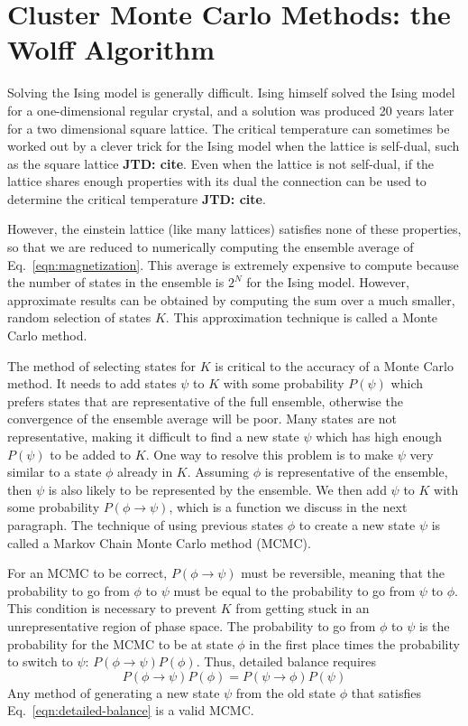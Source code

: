\documentclass[amsmath,amssymb,aps,twocolumn]{revtex4-2}
\newcommand{\jtd}[1]{{\color{red}\textbf{JTD: #1}}}
\begin{document}
\section{Cluster Monte Carlo Methods: the Wolff Algorithm}
Solving the Ising model is generally difficult. Ising himself solved the Ising model for a one-dimensional regular crystal, and a solution was produced 20 years later for a two dimensional square lattice. The critical temperature can sometimes be worked out by a clever trick for the Ising model when the lattice is self-dual, such as the square lattice \jtd{cite}. Even when the lattice is not self-dual, if the lattice shares enough properties with its dual the connection can be used to determine the critical temperature \jtd{cite}.

However, the einstein lattice (like many lattices) satisfies none of these properties, so that we are reduced to numerically computing the ensemble average of Eq.~\ref{eqn:magnetization}. This average is extremely expensive to compute because the number of states in the ensemble is $2^N$ for the Ising model. However, approximate results can be obtained by computing the sum over a much smaller, random selection of states $K$. This approximation technique is called a Monte Carlo method.

The method of selecting states for $K$ is critical to the accuracy of a Monte Carlo method. It needs to add states $\psi$ to $K$ with some probability $P(\psi)$ which prefers states that are representative of the full ensemble, otherwise the convergence of the ensemble average will be poor. Many states are not representative, making it difficult to find a new state $\psi$ which has high enough $P(\psi)$ to be added to $K$. One way to resolve this problem is to make $\psi$ very similar to a state $\phi$ already in $K$. Assuming $\phi$ is representative of the ensemble, then $\psi$ is also likely to be represented by the ensemble. We then add $\psi$ to $K$ with some probability $P(\phi \rightarrow \psi)$, which is a function we discuss in the next paragraph. The technique of using previous states $\phi$ to create a new state $\psi$ is called a Markov Chain Monte Carlo method (MCMC).

For an MCMC to be correct, $P(\phi \rightarrow \psi)$ must be reversible, meaning that the probability to go from $\phi$ to $\psi$ must be equal to the probability to go from $\psi$ to $\phi$. This condition is necessary to prevent $K$ from getting stuck in an unrepresentative region of phase space. The probability to go from $\phi$ to $\psi$ is the probability for the MCMC to be at state $\phi$ in the first place times the probability to switch to $\psi$: $P(\phi \rightarrow \psi)P(\phi)$. Thus, detailed balance requires
\begin{equation}
  P(\phi \rightarrow \psi)P(\phi) = P(\psi \rightarrow \phi)P(\psi)
  \label{eqn:detailed-balance}
\end{equation}
Any method of generating a new state $\psi$ from the old state $\phi$ that satisfies Eq.~\ref{eqn:detailed-balance} is a valid MCMC.
\end{document}
